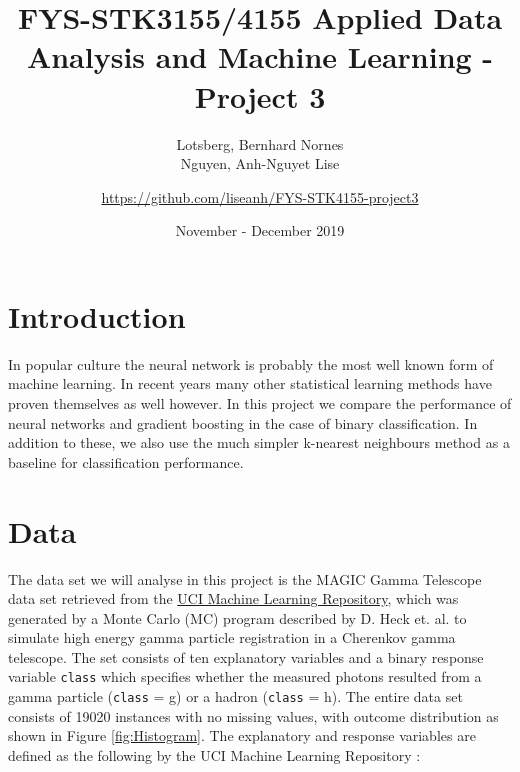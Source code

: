 \documentclass[a4paper, 11pt, twocolumn]{article}
\title{FYS-STK3155/4155 Applied Data Analysis and Machine Learning - Project 3 }
\author{Lotsberg, Bernhard Nornes \\ Nguyen, Anh-Nguyet Lise \and
\url{https://github.com/liseanh/FYS-STK4155-project3}}
\date{November - December 2019}
\begin{document}


\section{Introduction}
In popular culture the neural network is probably the most well known form of 
machine learning. In recent years many other statistical learning methods have 
proven themselves as well however. In this project we compare the performance of 
neural networks and gradient boosting in the case of binary classification.
In addition to these, we also use the much simpler k-nearest neighbours method 
as a baseline for classification performance.



\section{Data}

The data set we will analyse in this project is the MAGIC Gamma Telescope data
set retrieved from the \href{https://archive.ics.uci.edu/ml/datasets/MAGIC+Gamma
+Telescope}{UCI Machine Learning Repository}, which was generated by a Monte
Carlo (MC) program described by D. Heck et. al. \cite{heck1998corsika} to
simulate high energy gamma particle registration in a Cherenkov gamma telescope.
The set consists of ten explanatory variables and a binary response variable
\texttt{class} which specifies whether the measured photons resulted from a gamma
particle (\texttt{class} = g) or a hadron (\texttt{class} = h). The entire data
set consists of 19020 instances with no missing values, with outcome distribution
as shown in Figure \ref{fig:Histogram}. The explanatory and response variables
are defined as the following by the UCI Machine Learning Repository
\cite{Dua:2019}:
\end{document}
